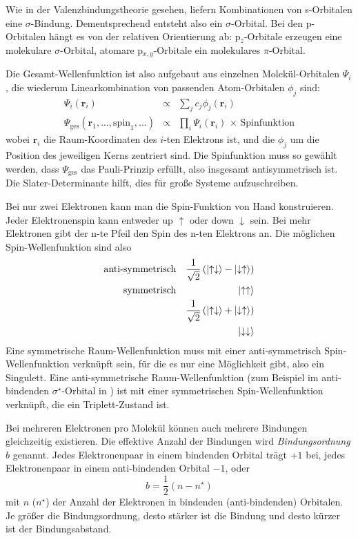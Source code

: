 Wie in der Valenzbindungstheorie gesehen, liefern Kombinationen von s-Orbitalen eine $\sigma$-Bindung. Dementsprechend entsteht also ein $\sigma$-Orbital. Bei den p-Orbitalen hängt es von der relativen Orientierung ab: p$_z$-Orbitale erzeugen eine molekulare $\sigma$-Orbital, atomare p$_{x,y}$-Orbitale ein molekulares  $\pi$-Orbital. 


Die Gesamt-Wellenfunktion ist also aufgebaut aus einzelnen Molekül-Orbitalen $\Psi_i$, die wiederum Linearkombination von passenden Atom-Orbitalen $\phi_j$ sind:
\begin{eqnarray}
 \Psi_i(\mathbf{r}_i) & \propto &  \sum_j c_j \phi_j(\mathbf{r}_i) \\
  \Psi_\text{ges}(\mathbf{r}_1, ..., \text{spin}_1, ...)  & \propto & \prod_i \Psi_i(\mathbf{r}_i) \, \times \, \text{Spinfunktion}
\end{eqnarray}
wobei $\mathbf{r}_i$ die Raum-Koordinaten des $i$-ten Elektrons ist, und die $\phi_j$ um die Position des jeweiligen Kerns zentriert sind. Die Spinfunktion muss so gewählt werden, dass $ \Psi_\text{ges}$ das Pauli-Prinzip erfüllt, also insgesamt antisymmetrisch ist. Die Slater-Determinante hilft, dies für große Systeme aufzuschreiben.

Bei nur zwei Elektronen kann man die Spin-Funktion von Hand konstruieren. Jeder Elektronenspin kann entweder up $\uparrow$ oder down $\downarrow$ sein. Bei mehr Elektronen gibt der n-te Pfeil den Spin des n-ten Elektrons an.  Die möglichen Spin-Wellenfunktion sind also 
\begin{eqnarray}
\text{anti-symmetrisch} &  & \frac{1}{\sqrt{2}} \left( \ket{\uparrow \downarrow} - \ket{\downarrow \uparrow} \right) \\
\text{symmetrisch} &  &\ket{\uparrow \uparrow}  \\
& &\frac{1}{\sqrt{2}} \left( \ket{\uparrow \downarrow} + \ket{\downarrow \uparrow} \right) \\
& &\ket{\downarrow \downarrow}  
\end{eqnarray}
Eine symmetrische Raum-Wellenfunktion muss mit einer anti-symmetrisch Spin-Wellenfunktion verknüpft sein, für die es nur eine Möglichkeit gibt, also ein Singulett. Eine anti-symmetrische Raum-Wellenfunktion (zum Beispiel im anti-bindenden $\sigma^\star$-Orbital in ) ist mit einer symmetrischen Spin-Wellenfunktion verknüpft, die ein Triplett-Zustand ist.

Bei mehreren Elektronen pro Molekül können auch mehrere Bindungen gleichzeitig existieren. Die effektive Anzahl der Bindungen wird \textit{Bindungsordnung} $b$ genannt. Jedes Elektronenpaar in einem bindenden Orbital trägt $+1$ bei, jedes Elektronenpaar in einem anti-bindenden Orbital $-1$, oder
\begin{equation}
  b = \frac{1}{2} \left( n - n^\star \right)
\end{equation}
mit $n$ ($n^\star$) der Anzahl der Elektronen in bindenden (anti-bindenden) Orbitalen. Je größer die Bindungsordnung, desto stärker ist die Bindung und desto kürzer ist der Bindungsabstand.


